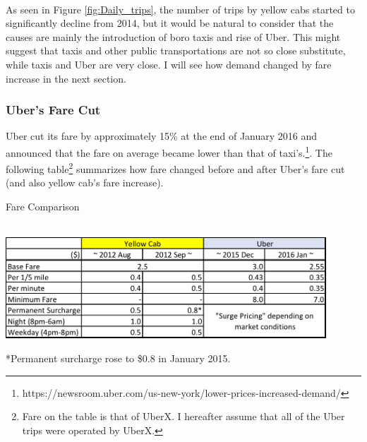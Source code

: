 \\\indent As seen in Figure \ref{fig:Daily_trips}, the number of trips by yellow cabs started to significantly decline from 2014, but it would be natural to consider that the causes are mainly the introduction of boro taxis and rise of Uber. This might suggest that taxis and other public transportations are not so close substitute, while taxis and Uber are very close. I will see how demand changed by fare increase in the next section.


\vspace{0.5cm}
\subsubsection{Uber's Fare Cut}
\hspace{0.5cm} Uber cut its fare by approximately 15\% at the end of January 2016 and announced that the fare on average became lower than that of taxi's.\footnote{https://newsroom.uber.com/us-new-york/lower-prices-increased-demand/}. The following table\footnote{Fare on the table is that of UberX. I hereafter assume that all of the Uber trips were operated by UberX.} summarizes how fare changed before and after Uber's fare cut (and also yellow cab's fare increase). 

\begin{table}[h]
\begin{center}
\caption{Fare Comparison}\label{tab:fare_comparison}\\
\vspace{0.2cm}
\includegraphics[width=12cm]{Tables/fare_comparison.png}
\end{center}
{\footnotesize \hspace{2.5cm} *Permanent surcharge rose to \$0.8 in January 2015.}
\end{table}

